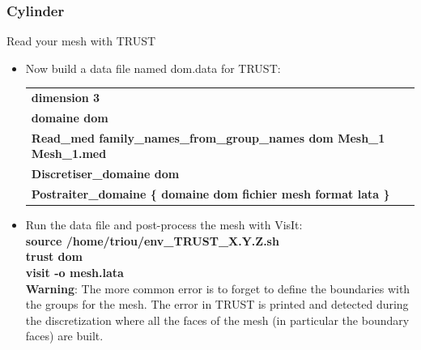 \documentclass[10pt, hyperref={unicode=true,pdfusetitle, bookmarks=true,bookmarksnumbered=false,bookmarksopen=false, breaklinks=false,pdfborder={0 0 1},backref=true,colorlinks=true,linkcolor=darkblue,pageanchor}]{beamer}
\begin{document}
\begin{frame}
\frametitle{Cylinder}
\begin{block}{Read your mesh with TRUST}

\begin{itemize}
\item \label{read_mesh} Now build a data file named dom.data for TRUST:\\
\vspace{0.2cm}
\begin{tabular}{|l|}
\hline 
\textbf{dimension 3 }\tabularnewline
\textbf{domaine dom }\tabularnewline
\textbf{Read\_med family\_names\_from\_group\_names dom Mesh\_1 Mesh\_1.med }\tabularnewline
\textbf{Discretiser\_domaine\index{discretiser\_domaine} dom }\tabularnewline
\textbf{Postraiter\_domaine\index{Postraiter\_domaine} \{ domaine dom fichier mesh format lata\index{format lata}
\}}\tabularnewline
\hline 
\end{tabular}

\item Run the data file and post-process the mesh with VisIt:\\
\textbf{source  /home/triou/env\_TRUST\_X.Y.Z.sh} \\
\textbf{trust dom} \\
\textbf{visit -o mesh.lata} \\
\vspace{0.2cm}
\textbf{Warning}: The more common error is to forget to define the boundaries with the groups for the mesh. The error in TRUST is printed and detected during the discretization where all the faces of the mesh (in particular the boundary faces) are built.

\end{itemize}

\end{block}
\end{frame}
\end{document}
